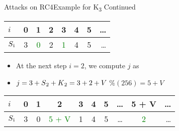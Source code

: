 \documentclass[
	aspectratio=169,	%
	onlytextwidth,		%
	t					%
	]{beamer}
\begin{document}
\begin{frame}[fragile]{Attacks on RC4}{Example for K\textsubscript{3} Continued}

	\begin{table}[h!]
		\begin{center}
			\begin{tabular}{l|c|c|c|c|c|c|r}
			$i$ & 0 & 1 & 2 & 3 & 4 & 5 & \dots\\
			\hline
			$S\textsubscript{i}$ & 3 & \textcolor{green}{0} & 2 & \textcolor{green}{1} & 4 & 5 & \dots\\
			\end{tabular}
		\end{center}
	\end{table}

	\begin{itemize}
		\item At the next step $i = 2$, we compute $j$ as
		\item $j = 3 + S\textsubscript{2} + K\textsubscript{2} = 3 + 2 + V$ $\% (256) = 5+V$
	\end{itemize}

	\begin{table}[h!]
		\begin{center}
			\begin{tabular}{l|c|c|c|c|c|c|c|c|r}
			$i$ & 0 & 1 & 2 & 3 & 4 & 5 & \dots & 5 + V & \dots\\
			\hline
			$S\textsubscript{i}$ & 3 & 0 & \textcolor{green}{5 + V} & 1 & 4 & 5 & \dots & \textcolor{green}{2} & \dots\\
			\end{tabular}
		\end{center}
	\end{table}

\end{frame}
\end{document}
